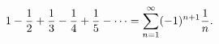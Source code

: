 \begin{displaymath}
1 - {1 \over 2} + {1 \over 3} - {1 \over 4} + {1 
\over 5} - \cdots =\sum_{n=1}^\infty (-1)^{n+1} {1 
\over n}.
\end{displaymath}
